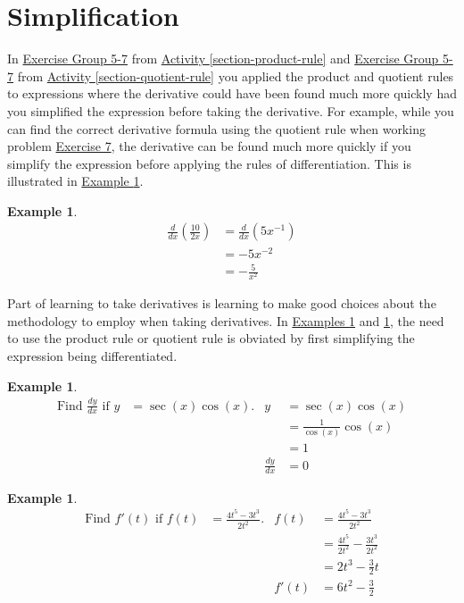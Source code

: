 \documentclass[10pt,oneside,]{book}
\theoremstyle{plain}
\theoremstyle{definition}
\newtheorem{example}[theorem]{Example}
\numberwithin{equation}{section}
\newcommand{\fe}[2]{#1\mathopen{}\left(#2\right)\mathclose{}}
\newcommand{\fd}[1]{#1'}
\newcommand{\lz}[2]{\frac{d#1}{d#2}}
\newcommand{\lzoo}[2]{{\frac{d}{d#1}}{\left(#2\right)}}
\begin{document}
\section[Simplification]{Simplification}\label{section-simplification}
In \hyperlink{exercisegroup-unsimplified-product}{Exercise Group 5-7} from \hyperref[section-product-rule]{Activity \ref{section-product-rule}} and \hyperlink{exercisegroup-unsimplified-quotient}{Exercise Group 5-7} from \hyperref[section-quotient-rule]{Activity \ref{section-quotient-rule}} you applied the product and quotient rules to expressions where the derivative could have been found much more quickly had you simplified the expression before taking the derivative.  For example, while you can find the correct derivative formula using the quotient rule when working problem \hyperlink{unsimplified-quotient-last}{Exercise 7}, the derivative can be found much more quickly if you simplify the expression before applying the rules of differentiation. This is illustrated in \hyperref[example-simplify-first]{Example \ref{example-simplify-first}}.%
\begin{example}\label{example-simplify-first}
\begin{align*}
\lzoo{x}{\frac{10}{2x}}&=\lzoo{x}{5x^{-1}}\\
&=-5x^{-2}\\
&=-\frac{5}{x^{2}}
\end{align*}%
\end{example}
\par
Part of learning to take derivatives is learning  to make good choices about the methodology to employ when taking derivatives.  In \hyperref[example-simplify-second]{Examples \ref{example-simplify-second}} and \hyperref[example-simplify-third]{\ref{example-simplify-third}}, the need to use the product rule or quotient rule is obviated by first simplifying the expression being differentiated.%
\begin{example}\label{example-simplify-second}
\begin{align*}
\text{Find }\lz{y}{x}\text{ if }y&=\fe{\sec}{x}\fe{\cos}{x}\text{.}&y&=\fe{\sec}{x}\fe{\cos}{x}\\
&&&=\frac{1}{\fe{\cos}{x}}\fe{\cos}{x}\\
&&&=1\\
&&\lz{y}{x}&=0
\end{align*}%
\end{example}
\begin{example}\label{example-simplify-third}
\begin{align*}
\text{Find }\fe{\fd{f}}{t}\text{ if }\fe{f}{t}&=\frac{4t^5-3t^3}{2t^2}\text{.}&\fe{f}{t}&=\frac{4t^5-3t^3}{2t^2}\\
&&&=\frac{4t^5}{2t^2}-\frac{3t^3}{2t^2}\\
&&&=2t^3-\frac{3}{2}t\\
&&\fe{\fd{f}}{t}&=6t^2-\frac{3}{2}
\end{align*}%
\end{example}
\typeout{************************************************}
\typeout{************************************************}
\end{document}
